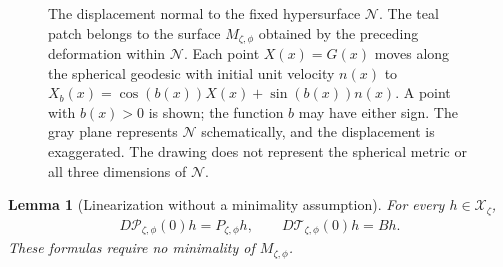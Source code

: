 \documentclass[a4paper,11pt,oneside,reqno]{amsart}
\numberwithin{equation}{section}
\newtheorem{lemma}[theorem]{Lemma}
\theoremstyle{definition}
\begin{document}
\begin{figure}[htbp]
    \endgroup
    \caption{The displacement normal to the fixed hypersurface
    $\mathcal N$. The teal patch belongs to the surface
    $M_{\zeta,\phi}$ obtained by the preceding deformation within
    $\mathcal N$. Each point $X(x)=G(x)$ moves along the spherical
    geodesic with initial unit velocity $n(x)$ to
    $X_b(x)=\cos(b(x))X(x)+\sin(b(x))n(x)$.
    A point with $b(x)>0$ is shown; the function $b$ may have
    either sign. The gray plane represents $\mathcal N$
    schematically, and the displacement is exaggerated.
    The drawing does not represent the spherical metric or
    all three dimensions of $\mathcal N$.}
    \label{fig:s4-normal-displacement}
\end{figure}

\begin{lemma}[Linearization without a minimality assumption]
    \label{lem:s4-component-linearization}
    For every $h\in\mathcal{X}_\zeta$,
    \begin{align}
        \label{eq:s4-component-linearization}
        D\mathscr{P}_{\zeta,\phi}(0)h=P_{\zeta,\phi}h,
        \qquad D\mathscr{T}_{\zeta,\phi}(0)h=Bh.
    \end{align}
    These formulas require no minimality of $M_{\zeta,\phi}$.
\end{lemma}
\end{document}
